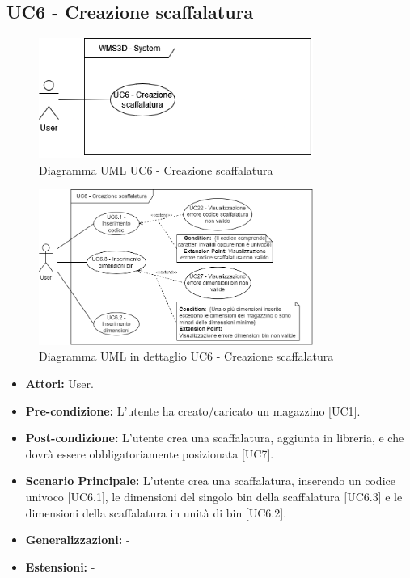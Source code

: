 \subsection{UC6 - Creazione scaffalatura}
\begin{figure}[H]
  \centering
  \includegraphics[width=0.8\textwidth]{UC_diagrams_1-10/UC6_sys.drawio.png}
   \caption{Diagramma UML UC6 - Creazione scaffalatura}
\end{figure}
\begin{figure}[H]
  \centering
  \includegraphics[width=0.8\textwidth]{UC_diagrams_1-10/UC6.drawio.png}
   \caption{Diagramma UML in dettaglio UC6 - Creazione scaffalatura}
\end{figure}
\begin{itemize}
    \item \textbf{Attori:} User.
    \item \textbf{Pre-condizione:}  L'utente ha creato/caricato un magazzino [UC1].
    \item \textbf{Post-condizione:} L'utente crea una scaffalatura, aggiunta in libreria, e che dovrà essere obbligatoriamente posizionata [UC7].
    \item \textbf{Scenario Principale:}  L'utente crea una scaffalatura, inserendo un codice univoco [UC6.1], le dimensioni del singolo bin della scaffalatura [UC6.3] e le dimensioni della scaffalatura in unità di bin [UC6.2].
    \item \textbf{Generalizzazioni:} -
    \item \textbf{Estensioni:} -
\end{itemize}


